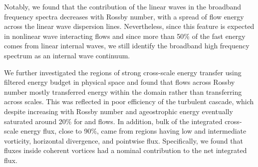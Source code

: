 \documentclass[../Rajarshi-thesis-draft.tex]{subfiles}
\begin{document}
	
	Notably, we found that  the contribution of the linear waves in the broadband frequency spectra decreases with Rossby number, with a  spread of flow energy across the linear wave dispersion lines. Nevertheless, since this feature is expected in nonlinear wave interacting flows and since  more than 50\% of the fast energy comes from linear internal  waves, we still identify the broadband high frequency spectrum as   an internal wave continuum. %
	   
	We further investigated the regions of strong cross-scale energy transfer using filtered energy budget in physical space and found that flows across Rossby number mostly transferred energy within the domain rather than transferring across scales. This was reflected in poor efficiency of the turbulent cascade, which despite increasing with Rossby number and ageostrophic energy eventually saturated around 20\% for \lro and \hro flows. In addition, bulk of the integrated cross-scale energy flux, close to 90\%, came from regions having low and intermediate vorticity, horizontal divergence, and pointwise flux. Specifically, we found that fluxes inside coherent vortices had a nominal contribution to the net integrated flux. 

	
\end{document}
